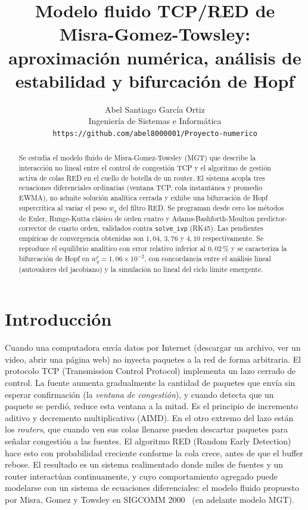 \documentclass[10pt,a4paper]{article}
\title{\vspace{-1.5em}Modelo fluido TCP/RED de Misra-Gomez-Towsley:\\
       aproximación numérica, análisis de estabilidad y bifurcación de Hopf}
\author{Abel Santiago García Ortiz\\
        \small Ingeniería de Sistemas e Informática\\
        \small \texttt{https://github.com/abel8000001/Proyecto-numerico}}
\date{\vspace{-1em}}
\begin{document}
\maketitle
\vspace{-2em}

\begin{abstract}
\noindent
\small
Se estudia el modelo fluido de Misra-Gomez-Towsley (MGT) que describe la
interacción no lineal entre el control de congestión TCP y el algoritmo
de gestión activa de colas RED en el cuello de botella de un router. El
sistema acopla tres ecuaciones diferenciales ordinarias (ventana TCP,
cola instantánea y promedio EWMA), no admite solución analítica cerrada
y exhibe una bifurcación de Hopf supercrítica al variar el peso $w_q$
del filtro RED. Se programan desde cero los métodos de Euler,
Runge-Kutta clásico de orden cuatro y Adams-Bashforth-Moulton
predictor-corrector de cuarto orden, validados contra
\texttt{solve\_ivp} (RK45). Las pendientes empíricas de convergencia
obtenidas son $1{,}04$, $3{,}76$ y $4{,}10$ respectivamente. Se
reproduce el equilibrio analítico con error relativo inferior al
$0{,}02\,\%$ y se caracteriza la bifurcación de Hopf en
$w_q^c = 1{,}06\times 10^{-2}$, con concordancia entre el análisis
lineal (autovalores del jacobiano) y la simulación no lineal del ciclo
límite emergente.
\end{abstract}
\vspace{-0.5em}

\section{Introducción}

Cuando una computadora envía datos por Internet (descargar un archivo,
ver un video, abrir una página web) no inyecta paquetes a la red de
forma arbitraria. El protocolo TCP (Transmission Control Protocol)
implementa un lazo cerrado de control. La fuente aumenta gradualmente la
cantidad de paquetes que envía sin esperar confirmación (la
\textit{ventana de congestión}), y cuando detecta que un paquete se
perdió, reduce esta ventana a la mitad. Es el principio de incremento
aditivo y decremento multiplicativo (AIMD). En el otro extremo del lazo
están los \textit{routers}, que cuando ven sus colas llenarse pueden
descartar paquetes para señalar congestión a las fuentes. El algoritmo
RED (Random Early Detection) hace esto con probabilidad creciente
conforme la cola crece, antes de que el buffer rebose. El resultado es
un sistema realimentado donde miles de fuentes y un router interactúan
continuamente, y cuyo comportamiento agregado puede modelarse con un
sistema de ecuaciones diferenciales: el modelo fluido propuesto por
Misra, Gomez y Towsley en SIGCOMM 2000~\cite{misra2000} (en adelante
modelo MGT).
\end{document}

